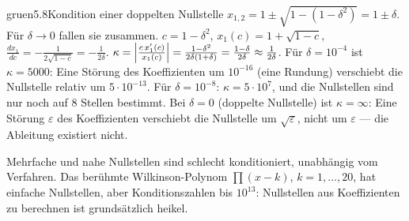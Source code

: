 \begin{loesungkarte}{gruen}{5.8}{Kondition einer doppelten Nullstelle}
$x_{1,2} = 1\pm\sqrt{1 - (1 - \delta^{2})} = 1\pm\delta$. Für $\delta\to0$ fallen sie zusammen.
$c = 1 - \delta^{2}$, $x_1(c) = 1 + \sqrt{1 - c}$, $\frac{dx_1}{dc} = -\frac1{2\sqrt{1 - c}} = -\frac1{2\delta}$.
$\kappa = \Bigl|\frac{c\,x_1'(c)}{x_1(c)}\Bigr| = \frac{1 - \delta^{2}}{2\delta(1 + \delta)} = \frac{1 - \delta}{2\delta}\approx\frac1{2\delta}$.
Für $\delta = 10^{-4}$ ist $\kappa = 5000$: Eine Störung des Koeffizienten um $10^{-16}$ (eine Rundung) verschiebt die Nullstelle relativ um $5\cdot10^{-13}$. Für $\delta = 10^{-8}$: $\kappa = 5\cdot10^{7}$, und die Nullstellen sind nur noch auf $8$ Stellen bestimmt. Bei $\delta = 0$ (doppelte Nullstelle) ist $\kappa = \infty$: Eine Störung $\varepsilon$ des Koeffizienten verschiebt die Nullstelle um $\sqrt\varepsilon$, nicht um $\varepsilon$ --- die Ableitung existiert nicht.
\begin{mitnehmen}\kastentext
Mehrfache und nahe Nullstellen sind schlecht konditioniert, unabhängig vom Verfahren. Das berühmte Wilkinson-Polynom $\prod(x - k)$, $k = 1, \dots, 20$, hat einfache Nullstellen, aber Konditionszahlen bis $10^{13}$: Nullstellen aus Koeffizienten zu berechnen ist grundsätzlich heikel.
\end{mitnehmen}
\end{loesungkarte}

